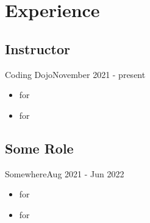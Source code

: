 \section{Experience}
\subsection{Instructor}{Coding Dojo}{November 2021 - present}
\begin{itemize}
    \item \lipsum[2][2] \emph{\lipsum[2][1]} for \textbf{\lipsum[5][1]} \lipsum[1][1] \textbf{\lipsum[4][4]} 
    \item \lipsum[2][2] \emph{\lipsum[2][1]} for \textbf{\lipsum[5][1]} \lipsum[1][1] \textbf{\lipsum[4][4]} 
\end{itemize}

\subsection{Some Role}{Somewhere}{Aug 2021 - Jun 2022}
\begin{itemize}
    \item \lipsum[2][2] \emph{\lipsum[2][1]} for \textbf{\lipsum[5][1]} \lipsum[1][1] \textbf{\lipsum[4][4]} 
    \item \lipsum[2][2] \emph{\lipsum[2][1]} for \textbf{\lipsum[5][1]} \lipsum[1][1] \textbf{\lipsum[4][4]} 
\end{itemize}
